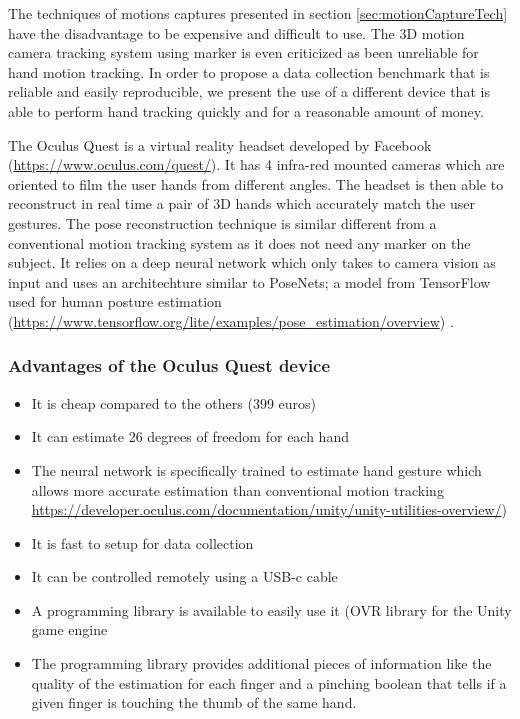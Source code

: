 \documentclass{article}
\begin{document}
The techniques of motions captures presented in section \ref{sec:motionCaptureTech} have the disadvantage to be expensive and difficult to use. The 3D motion camera tracking system using marker is even criticized as been unreliable for hand motion tracking. In order to propose a data collection benchmark that is reliable and easily reproducible, we present the use of a different device that is able to perform hand tracking quickly and for a reasonable amount of money.

The Oculus Quest is a virtual reality headset developed by Facebook (\url{https://www.oculus.com/quest/}). It has 4 infra-red mounted cameras which are oriented to film the user hands from different angles. The headset is then able to reconstruct in real time a pair of 3D hands which accurately match the user gestures. The pose reconstruction technique is similar different from a conventional motion tracking system as it does not need any marker on the subject. It relies on a deep neural network which only takes to camera vision as input and uses an architechture similar to PoseNets; a model from TensorFlow used for human posture estimation (\url{https://www.tensorflow.org/lite/examples/pose_estimation/overview}) \cite{ref:oculus1, ref:oculus2}.

\subsubsection{Advantages of the Oculus Quest device}
\begin{itemize}
	\item It is cheap compared to the others (399 euros)
	\item It can estimate 26 degrees of freedom for each hand \cite{ref:oculus2}
	\item The neural network is specifically trained to estimate hand gesture which allows more accurate estimation than conventional motion tracking
	\url{https://developer.oculus.com/documentation/unity/unity-utilities-overview/})
	\item It is fast to setup for data collection
	\item It can be controlled remotely using a USB-c cable
	\item A programming library is available to easily use it (OVR library for the Unity game engine
	\item The programming library provides additional pieces of information like the quality of the estimation for each finger and a pinching boolean that tells if a given finger is touching the thumb of the same hand.
\end{itemize}
\end{document}
